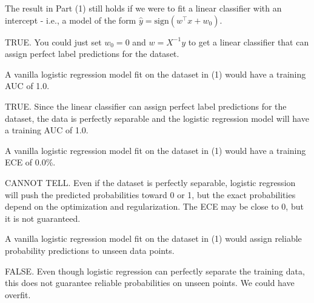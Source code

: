 \documentclass{article}
\begin{document}
\begin{probset}
\begin{prob}
\begin{subprobset}
        \begin{subprob}
            The result in Part (1) still holds if we were to fit a linear classifier with an intercept - i.e., a model of the form $\hat{y} = \text{sign}(w^\top x + w_0)$.

            \begin{soln}
                TRUE. You could just set $w_0 = 0$ and $w = X^{-1}y$ to get a linear classifier that can assign perfect label predictions for the dataset.
            \end{soln}
        \end{subprob}

        \begin{subprob}
            A vanilla logistic regression model fit on the dataset in (1) would have a training AUC of 1.0.

            \begin{soln}
                TRUE. Since the linear classifier can assign perfect label predictions for the dataset, the data is perfectly separable and the logistic regression model will have a training AUC of 1.0.
            \end{soln}
        \end{subprob}

        \begin{subprob}
            A vanilla logistic regression model fit on the dataset in (1) would have a training ECE of 0.0\%.

            \begin{soln}
                CANNOT TELL. Even if the dataset is perfectly separable, logistic regression will push the predicted probabilities toward 0 or 1, but the exact probabilities depend on the optimization and regularization. The ECE may be close to 0, but it is not guaranteed.
            \end{soln}
        \end{subprob}

        \begin{subprob}
            A vanilla logistic regression model fit on the dataset in (1) would assign reliable probability predictions to unseen data points.

            \begin{soln}
                FALSE. Even though logistic regression can perfectly separate the training data, this does not guarantee reliable probabilities on unseen points. We could have overfit.
            \end{soln}
        \end{subprob}
    \end{subprobset}
\end{prob}


\end{probset}
\end{document}
